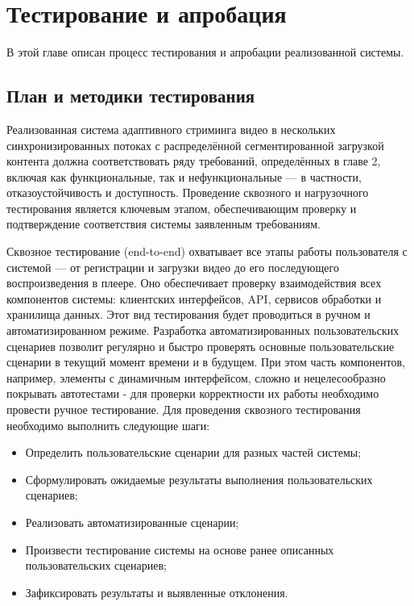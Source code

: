\chapter{Тестирование и апробация}

	В этой главе описан процесс тестирования и апробации реализованной системы.

\section{План и методики тестирования}

	Реализованная система адаптивного стриминга видео в нескольких синхронизированных потоках с распределённой сегментированной загрузкой контента должна соответствовать ряду требований, определённых в главе 2, включая как функциональные, так и нефункциональные — в частности, отказоустойчивость и доступность. Проведение сквозного и нагрузочного тестирования является ключевым этапом, обеспечивающим проверку и подтверждение соответствия системы заявленным требованиям.

	Сквозное тестирование (end-to-end) охватывает все этапы работы пользователя с системой — от регистрации и загрузки видео до его последующего воспроизведения в плеере. Оно обеспечивает проверку взаимодействия всех компонентов системы: клиентских интерфейсов, API, сервисов обработки и хранилища данных. Этот вид тестирования будет проводиться в ручном и автоматизированном режиме. Разработка автоматизированных пользовательских сценариев позволит регулярно и быстро проверять основные пользовательские сценарии в текущий момент времени и в будущем. При этом часть компонентов, например, элементы с динамичным интерфейсом, сложно и нецелесообразно покрывать автотестами - для проверки корректности их работы необходимо провести ручное тестирование. Для проведения сквозного тестирования необходимо выполнить следующие шаги:

	\begin{itemize}[label=$\bullet$]
		\item Определить пользовательские сценарии для разных частей системы;
		\item Сформулировать ожидаемые результаты выполнения пользовательских сценариев;
		\item Реализовать автоматизированные сценарии;
		\item Произвести тестирование системы на основе ранее описанных пользовательских сценариев;
		\item Зафиксировать результаты и выявленные отклонения.
	\end{itemize}

